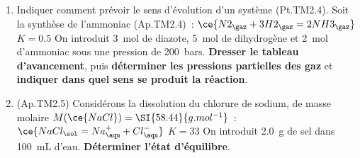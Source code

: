 \documentclass[a4paper, 12pt, final, garamond]{book}
\begin{document}
\begin{enumerate}
	\item Indiquer comment prévoir le sens d'évolution d'un système (Pt.TM2.4).
	      Soit la synthèse de l'ammoniac (Ap.TM2.4)~:
	      \hspace*{80pt}
	      $\ce{N2_{\gaz} + 3H2_{\gaz} = 2NH3_{\gaz}}$
	      \hspace*{\fill}
	      $K = \num{0.5}$
	      \smallbreak
	      On introduit \SI{3}{mol} de diazote, \SI{5}{mol} de dihydrogène et
	      \SI{2}{mol} d'ammoniac sous une pression de \SI{200}{bars}.
	      \textbf{Dresser le tableau d'avancement}, puis
	      \textbf{déterminer les pressions partielles des gaz} et \textbf{indiquer
		      dans quel sens se produit la réaction}.

	\item{} (Ap.TM2.5) Considérons la dissolution du chlorure de sodium, de
	      masse molaire $M(\ce{NaCl}) = \SI{58.44}{g.mol^{-1}}$~:
	      \hspace*{\fill}
	      $\ce{NaCl_{\sol} = Na^{+}_{\aqu} + Cl^{-}_{\aqu}}$
	      \hspace*{\fill}
	      $K=33$
	      \smallbreak
	      On introduit \SI{2.0}{g} de sel dans \SI{100}{mL} d'eau.
	      \textbf{Déterminer l'état d'équilibre}.


\end{enumerate}
\end{document}
